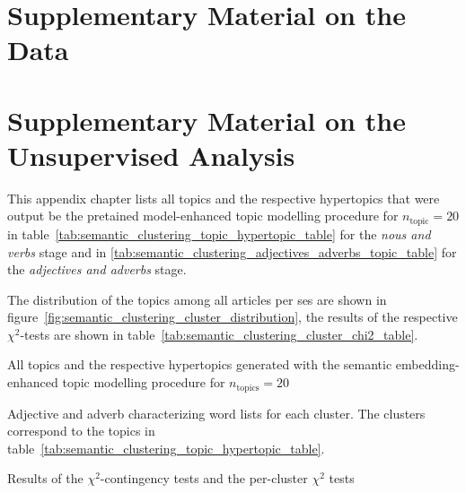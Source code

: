 \renewcommand{\imagepath}{../90-appendix/img}

\appendix

\chapter{Supplementary Material on the Data}\label{ch:data_appendix}



\chapter{Supplementary Material on the Unsupervised Analysis}\label{ch:unsupervised_appendix}
This appendix chapter lists all topics and the respective hypertopics that were output be the pretained model-enhanced topic modelling procedure for $n_\text{topic} = 20$ in table~\ref{tab:semantic_clustering_topic_hypertopic_table} for the \textit{nous and verbs} stage and in \ref{tab:semantic_clustering_adjectives_adverbs_topic_table} for the \textit{adjectives and adverbs} stage.

The distribution of the topics among all articles per \gls{ses} are shown in figure~\ref{fig:semantic_clustering_cluster_distribution}, the results of the respective $\chi^2$-tests are shown in table~\ref{tab:semantic_clustering_cluster_chi2_table}.
\begin{table}[h]
    \centering
    
    \caption{All topics and the respective hypertopics generated with the semantic embedding-enhanced topic modelling procedure for $n_\text{topics}=20$}\label{tab:semantic_clustering_topic_hypertopic_table}
\end{table}

\begin{table}
    \centering
    
    \caption{Adjective and adverb characterizing word lists for each cluster. The clusters correspond to the topics in table~\ref{tab:semantic_clustering_topic_hypertopic_table}.}\label{tab:semantic_clustering_adjectives_adverbs_topic_table}
\end{table}

\begin{table}
    \centering
    
    \caption{Results of the $\chi^2$-contingency tests and the per-cluster $\chi^2$ tests}\label{tab:semantic_clustering_cluster_chi2_table}
\end{table}

